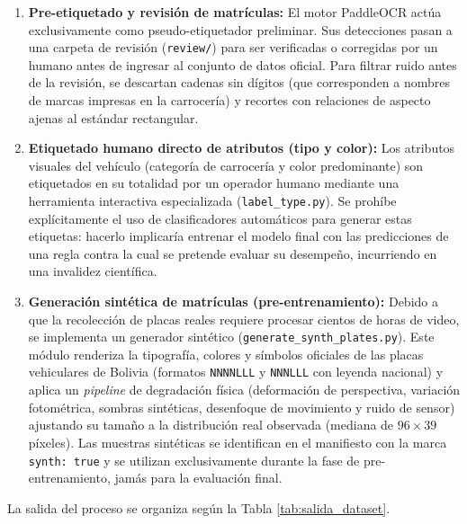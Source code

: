 \begin{enumerate}
    \item \textbf{Pre-etiquetado y revisión de matrículas:} El motor PaddleOCR
        actúa exclusivamente como pseudo-etiquetador preliminar. Sus detecciones
        pasan a una carpeta de revisión (\texttt{review/}) para ser verificadas o
        corregidas por un humano antes de ingresar al conjunto de datos oficial.
        Para filtrar ruido antes de la revisión, se descartan cadenas sin dígitos
        (que corresponden a nombres de marcas impresas en la carrocería) y recortes
        con relaciones de aspecto ajenas al estándar rectangular.

    \item \textbf{Etiquetado humano directo de atributos (tipo y color):} Los
        atributos visuales del vehículo (categoría de carrocería y color
        predominante) son etiquetados en su totalidad por un operador humano mediante
        una herramienta interactiva especializada (\texttt{label\_type.py}).
        Se prohíbe explícitamente el uso de clasificadores automáticos para generar
        estas etiquetas: hacerlo implicaría entrenar el modelo final con las
        predicciones de una regla contra la cual se pretende evaluar su desempeño,
        incurriendo en una invalidez científica.

    \item \textbf{Generación sintética de matrículas (pre-entrenamiento):} Debido
        a que la recolección de placas reales requiere procesar cientos de horas de
        video, se implementa un generador sintético
        (\texttt{generate\_synth\_plates.py}). Este módulo renderiza la tipografía,
        colores y símbolos oficiales de las placas vehiculares de Bolivia (formatos
        \texttt{NNNNLLL} y \texttt{NNNLLL} con leyenda nacional) y aplica un
        \textit{pipeline} de degradación física (deformación de perspectiva,
        variación fotométrica, sombras sintéticas, desenfoque de movimiento y
        ruido de sensor) ajustando su tamaño a la distribución real observada
        (mediana de $96 \times 39$ píxeles). Las muestras sintéticas se identifican
        en el manifiesto con la marca \texttt{synth: true} y se utilizan
        exclusivamente durante la fase de pre-entrenamiento, jamás para la
        evaluación final.
\end{enumerate}

La salida del proceso se organiza según la Tabla \ref{tab:salida_dataset}.

